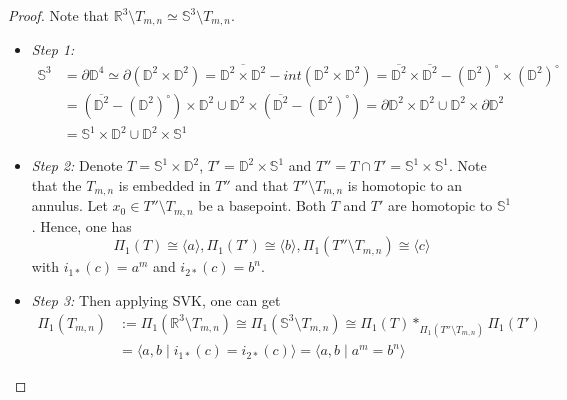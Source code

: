 \begin{proof}
    Note that $\mathbb{R}^3 \setminus T_{m,n} \simeq \mathbb{S}^3 \setminus T_{m,n}$.
    \begin{itemize}
        \item \textit{Step 1:}
        \begin{align*}
            \mathbb{S}^3 &= \partial \mathbb{D}^4 \simeq \partial (\mathbb{D}^2 \times \mathbb{D}^2) = \overline{\mathbb{D}^2 \times \mathbb{D}^2} - int(\mathbb{D}^2 \times \mathbb{D}^2) = \overline{\mathbb{D}^2} \times \overline{\mathbb{D}^2} - (\mathbb{D}^2)^\circ \times (\mathbb{D}^2)^\circ\\
            &= (\overline{\mathbb{D}^2} - (\mathbb{D}^2)^\circ) \times \mathbb{D}^2 \cup \mathbb{D}^2 \times (\overline{\mathbb{D}^2} - (\mathbb{D}^2)^\circ) = \partial \mathbb{D}^2 \times \mathbb{D}^2 \cup \mathbb{D}^2 \times \partial \mathbb{D}^2\\
            &= \mathbb{S}^1 \times \mathbb{D}^2 \cup \mathbb{D}^2 \times \mathbb{S}^1
        \end{align*}
        
        \item \textit{Step 2:} Denote $T = \mathbb{S}^1 \times \mathbb{D}^2$, $T' = \mathbb{D}^2 \times \mathbb{S}^1$ and $T'' = T \cap T' = \mathbb{S}^1 \times \mathbb{S}^1$. Note that the $T_{m,n}$ is embedded in $T''$ and that $T''\setminus T_{m,n}$ is homotopic to an annulus. Let $x_0 \in T'' \setminus T_{m,n}$ be a basepoint. Both $T$ and $T'$ are homotopic to $\mathbb{S}^1$. Hence, one has
        \begin{equation*}
            \Pi_1(T) \cong \langle a \rangle  , \Pi_1(T') \cong \langle b \rangle ,\Pi_{1}(T'' \setminus T_{m,n}) \cong \langle c \rangle 
        \end{equation*}
        with $i_{1*} (c) = a^m$ and $i_{2*} (c) =b^n$. 

        \item \textit{Step 3:} Then applying SVK, one can get
        \begin{align*}
            \Pi_1(T_{m,n}) &:=\Pi_1(\mathbb{R}^3 \setminus T_{m,n}) \cong \Pi_1(\mathbb{S}^3 \setminus T_{m,n} ) \cong \Pi_1(T) *_{\Pi_{1}(T''\setminus T_{m,n})} \Pi_1 (T')\\
            &= \langle a ,b \mid i_{1*} (c) = i_{2*}(c) \rangle = \langle a,b \mid a^m = b^n \rangle
        \end{align*}
    \end{itemize}
\end{proof}


